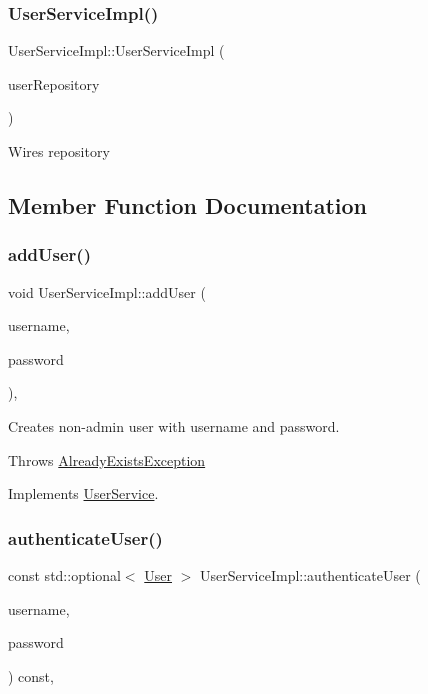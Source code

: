 \subsubsection{\texorpdfstring{User\+Service\+Impl()}{UserServiceImpl()}}
{\footnotesize\ttfamily User\+Service\+Impl\+::\+User\+Service\+Impl (\begin{DoxyParamCaption}\item[{std\+::unique\+\_\+ptr$<$ \hyperlink{classUserRepository}{User\+Repository} $>$ \&\&}]{user\+Repository }\end{DoxyParamCaption})}

Wires repository 

\subsection{Member Function Documentation}
\mbox{\label{classUserServiceImpl_adf6e4832c7da54d3894f3eb554a8ffe1}} 
\subsubsection{\texorpdfstring{add\+User()}{addUser()}}
{\footnotesize\ttfamily void User\+Service\+Impl\+::add\+User (\begin{DoxyParamCaption}\item[{const std\+::string \&}]{username,  }\item[{const std\+::string \&}]{password }\end{DoxyParamCaption})\hspace{0.3cm}{\ttfamily [override]}, {\ttfamily [virtual]}}

Creates non-\/admin user with username and password.

Throws \hyperlink{classAlreadyExistsException}{Already\+Exists\+Exception} 

Implements \hyperlink{classUserService_a7eb582fe91a2a83a433dbe461a2f1457}{User\+Service}.

\mbox{\label{classUserServiceImpl_a6ea0a8f645f2be10ca7d48ca232fe70a}} 
\subsubsection{\texorpdfstring{authenticate\+User()}{authenticateUser()}}
{\footnotesize\ttfamily const std\+::optional$<$ \hyperlink{classUser}{User} $>$ User\+Service\+Impl\+::authenticate\+User (\begin{DoxyParamCaption}\item[{const std\+::string \&}]{username,  }\item[{const std\+::string \&}]{password }\end{DoxyParamCaption}) const\hspace{0.3cm}{\ttfamily [override]}, {\ttfamily [virtual]}}

